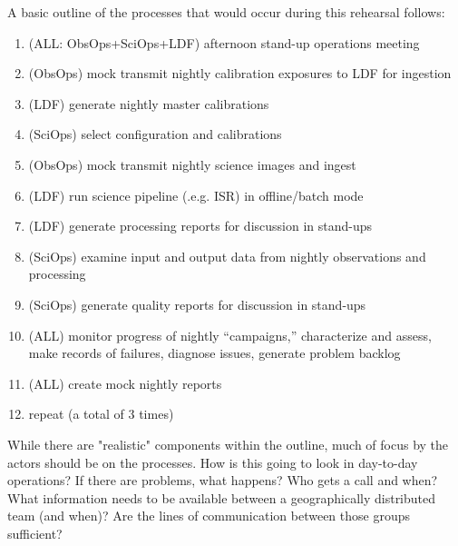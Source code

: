A basic outline of the processes that would occur during this rehearsal 
follows:
\begin{enumerate}[topsep=-8pt]
\item (ALL: ObsOps+SciOps+LDF) afternoon stand-up operations meeting
\item (ObsOps) mock transmit nightly calibration exposures to LDF for ingestion
\item (LDF) generate nightly master calibrations
\item (SciOps) select configuration and calibrations
\item (ObsOps) mock transmit nightly science images and ingest
\item (LDF) run science pipeline (.e.g. ISR) in offline/batch mode
\item (LDF) generate processing reports for discussion in stand-ups
\item (SciOps) examine input and output data from nightly observations and
processing
\item (SciOps) generate quality reports for discussion in stand-ups
\item (ALL) monitor progress of nightly “campaigns,” characterize and assess, 
make records of failures, diagnose issues, generate problem backlog
\item (ALL) create mock nightly reports
\item repeat (a total of 3 times)
\end{enumerate}

While there are "realistic" components within the outline, much of focus by 
the actors should be on the processes.  How is this going to look in 
day-to-day operations?  If there are problems, what happens?  Who gets a 
call and when?  What information needs to be available between a geographically
distributed team (and when)?  Are the lines of communication between those
groups sufficient?


%
%

